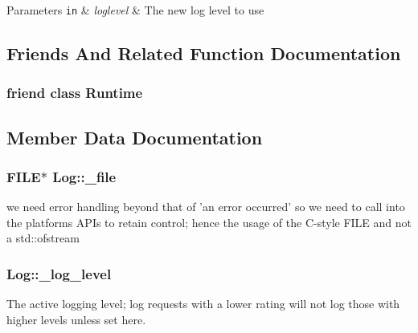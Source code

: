 \begin{DoxyParams}[1]{Parameters}
\mbox{\tt in}  & {\em loglevel} & The new log level to use \\
\hline
\end{DoxyParams}


\subsection{Friends And Related Function Documentation}
\subsubsection[{Runtime}]{\setlength{\rightskip}{0pt plus 5cm}friend class {\bf Runtime}\hspace{0.3cm}{\ttfamily [friend]}}\label{class_log_af3d14e26ba8af9e6cc5a32aad8446de7}


\subsection{Member Data Documentation}
\subsubsection[{\-\_\-file}]{\setlength{\rightskip}{0pt plus 5cm}F\-I\-L\-E$\ast$ Log\-::\-\_\-file\hspace{0.3cm}{\ttfamily [private]}}\label{class_log_ab8a09fa20d7911772a2f3c1af1da2fef}
we need error handling beyond that of 'an error occurred' so we need to call into the platforms A\-P\-Is to retain control; hence the usage of the C-\/style F\-I\-L\-E and not a std\-::ofstream 
\subsubsection[{\-\_\-log\-\_\-level}]{ Log\-::\-\_\-log\-\_\-level\hspace{0.3cm}{\ttfamily [private]}}\label{class_log_a65f1cae0e84627fe046ff4cb5671f53c}
The active logging level; log requests with a lower rating will not log those with higher levels unless set here. 
